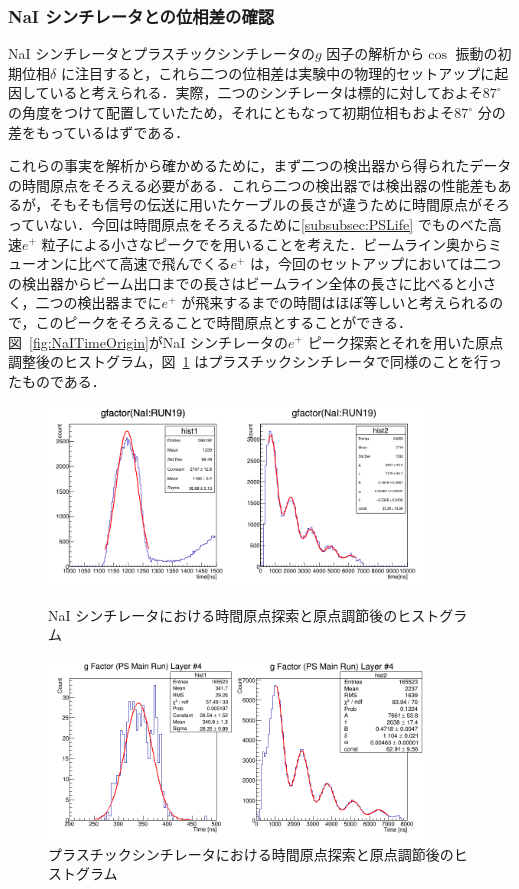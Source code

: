 \subsubsection{NaI シンチレータとの位相差の確認}
\label{subsubsec:PhaseCheck}
NaI シンチレータとプラスチックシンチレータの$g$ 因子の解析から$\cos$ 振動の初期位相$\delta$ に注目すると，これら二つの位相差は実験中の物理的セットアップに起因していると考えられる．実際，二つのシンチレータは標的に対しておよそ$87^{\circ}$ の角度をつけて配置していたため，それにともなって初期位相もおよそ$87^{\circ}$ 分の差をもっているはずである．

これらの事実を解析から確かめるために，まず二つの検出器から得られたデータの時間原点をそろえる必要がある．これら二つの検出器では検出器の性能差もあるが，そもそも信号の伝送に用いたケーブルの長さが違うために時間原点がそろっていない．今回は時間原点をそろえるために\ref{subsubsec:PSLife} でものべた高速$e^{+}$ 粒子による小さなピークでを用いることを考えた．ビームライン奥からミューオンに比べて高速で飛んでくる$e^{+}$ は，今回のセットアップにおいては二つの検出器からビーム出口までの長さはビームライン全体の長さに比べると小さく，二つの検出器までに$e^{+}$ が飛来するまでの時間はほぼ等しいと考えられるので，このピークをそろえることで時間原点とすることができる．図~\ref{fig:NaITimeOrigin}がNaI シンチレータの$e^{+}$ ピーク探索とそれを用いた原点調整後のヒストグラム，図~\ref{fig:PSTimeOrigin} はプラスチックシンチレータで同様のことを行ったものである．

\begin{figure}[h]
	\centering
	\includegraphics[width = 0.9\textwidth]{figure/odagawa/NaITimeOrigin.png}
	\caption{NaI シンチレータにおける時間原点探索と原点調節後のヒストグラム}
	\label{fig:NaITimeOrigin}
	\includegraphics[width = 0.9\textwidth]{figure/odagawa/PSTimeOrigin.png}
	\caption{プラスチックシンチレータにおける時間原点探索と原点調節後のヒストグラム}
	\label{fig:PSTimeOrigin}
\end{figure}

